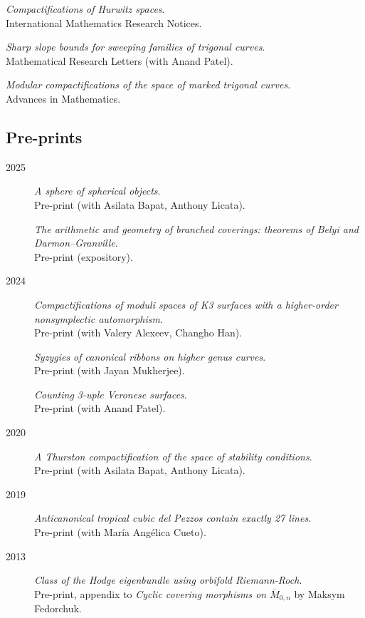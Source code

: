 \documentclass[11pt]{article}
\begin{document}
\begin{description}
\emph{Compactifications of Hurwitz spaces}.\\
International Mathematics Research Notices.
\item[{2013}] \emph{Sharp slope bounds for sweeping families of trigonal curves}.\\
Mathematical Research Letters (with Anand Patel).

\emph{Modular compactifications of the space of marked trigonal curves}.\\
Advances in Mathematics.
\end{description}
\subsection*{Pre-prints}
\label{sec:org754b951}
\label{orgdbe5d9a}
\begin{description}
\item[{2025}] \emph{A sphere of spherical objects}.\\
Pre-print (with Asilata Bapat, Anthony Licata).

\emph{The arithmetic and geometry of branched coverings: theorems of Belyi and Darmon--Granville}.\\
Pre-print (expository).
\item[{2024}] \emph{Compactifications of moduli spaces of K3 surfaces with a higher-order nonsymplectic automorphism}.\\
Pre-print (with Valery Alexeev, Changho Han).

\emph{Syzygies of canonical ribbons on higher genus curves}.\\
Pre-print (with Jayan Mukherjee).

\emph{Counting 3-uple Veronese surfaces}.\\
Pre-print (with Anand Patel).
\item[{2020}] \emph{A Thurston compactification of the space of stability conditions}.\\
Pre-print (with Asilata Bapat, Anthony Licata).
\item[{2019}] \emph{Anticanonical tropical cubic del Pezzos contain exactly 27 lines}.\\
Pre-print (with María Angélica Cueto).
\item[{2013}] \emph{Class of the Hodge eigenbundle using orbifold Riemann-Roch}.\\
Pre-print, appendix to \emph{Cyclic covering morphisms on \(\overline M_{0,n}\)} by Maksym Fedorchuk.
\end{description}
\end{document}
